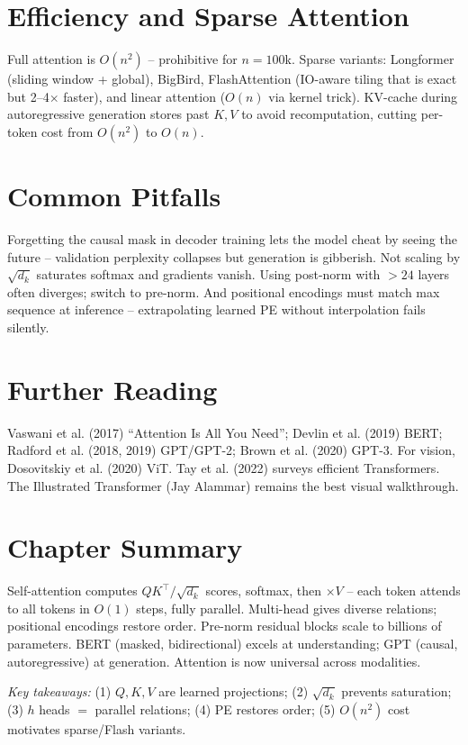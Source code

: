 \section{Efficiency and Sparse Attention}
Full attention is $O(n^2)$ -- prohibitive for $n=100$k. Sparse variants:
Longformer (sliding window + global), BigBird, FlashAttention (IO-aware tiling
that is exact but 2--4$\times$ faster), and linear attention ($O(n)$ via kernel
trick). KV-cache during autoregressive generation stores past $K,V$ to avoid
recomputation, cutting per-token cost from $O(n^2)$ to $O(n)$.

\section{Common Pitfalls}
Forgetting the causal mask in decoder training lets the model cheat by seeing
the future -- validation perplexity collapses but generation is gibberish.
Not scaling by $\sqrt{d_k}$ saturates softmax and gradients vanish. Using
post-norm with $>24$ layers often diverges; switch to pre-norm. And positional
encodings must match max sequence at inference -- extrapolating learned PE
without interpolation fails silently.

\section{Further Reading}
Vaswani et al. (2017) ``Attention Is All You Need''; Devlin et al. (2019) BERT;
Radford et al. (2018, 2019) GPT/GPT-2; Brown et al. (2020) GPT-3. For vision,
Dosovitskiy et al. (2020) ViT. Tay et al. (2022) surveys efficient Transformers.
The Illustrated Transformer (Jay Alammar) remains the best visual walkthrough.

\section{Chapter Summary}
Self-attention computes $QK^{\top}/\sqrt{d_k}$ scores, softmax, then
$\times V$ -- each token attends to all tokens in $O(1)$ steps, fully parallel.
Multi-head gives diverse relations; positional encodings restore order. Pre-norm
residual blocks scale to billions of parameters. BERT (masked, bidirectional)
excels at understanding; GPT (causal, autoregressive) at generation. Attention
is now universal across modalities.

\smallskip
\noindent\textit{Key takeaways:} (1) $Q,K,V$ are learned projections;
(2) $\sqrt{d_k}$ prevents saturation; (3) $h$ heads $=$ parallel relations;
(4) PE restores order; (5) $O(n^2)$ cost motivates sparse/Flash variants.

